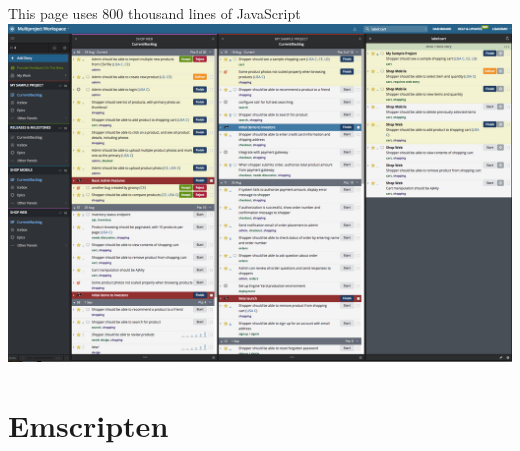 \documentclass{lug}
\newlength\beamerleftmargin
\begin{document}
\begin{frame}{This page uses 800 thousand lines of JavaScript}
    \vspace*{-4pt}%
    \hspace*{-\beamerleftmargin}%
    \includegraphics[width=\paperwidth]{graphics/pivotal_tracker}
\end{frame}

\renewcommand{\secimage}{graphics/emscripten_icon}
\section{Emscripten}
\end{document}

